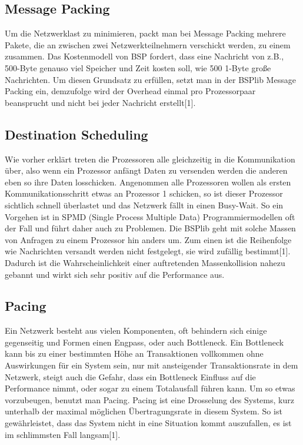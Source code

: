 \documentclass[a4paper,10pt]{scrartcl}
\begin{document}
\subsection{Message Packing}
Um die Netzwerklast zu minimieren, packt man bei Message Packing mehrere Pakete, die an zwischen zwei Netzwerkteilnehmern verschickt werden, zu einem zusammen. Das Kostenmodell von BSP fordert, dass eine Nachricht von z.B., 500-Byte genauso viel Speicher und Zeit kosten soll, wie 500 1-Byte große Nachrichten. Um diesen Grundsatz zu erfüllen, setzt man in der BSPlib Message Packing ein, demzufolge wird der Overhead einmal pro Prozessorpaar beansprucht und nicht bei jeder Nachricht erstellt[1].

\subsection{Destination Scheduling}
Wie vorher erklärt treten die Prozessoren alle gleichzeitig in die Kommunikation über, also wenn ein Prozessor anfängt Daten zu versenden werden die anderen eben so ihre Daten losschicken. Angenommen alle Prozessoren wollen als ersten Kommunikationsschritt etwas an Prozessor 1 schicken, so ist dieser Prozessor sichtlich schnell überlastet und das Netzwerk fällt in einen Busy-Wait. So ein Vorgehen ist in SPMD (Single Process Multiple Data) Programmiermodellen oft der Fall und führt daher auch zu Problemen. Die BSPlib geht mit solche Massen von Anfragen zu einem Prozessor hin anders um. Zum einen ist die Reihenfolge wie Nachrichten versandt werden nicht festgelegt, sie wird zufällig bestimmt[1]. Dadurch ist die Wahrscheinlichkeit einer auftretenden Massenkollision nahezu gebannt und wirkt sich sehr positiv auf die Performance aus.
\subsection{Pacing}
Ein Netzwerk besteht aus vielen Komponenten, oft behindern sich einige gegenseitig und Formen einen Engpass, oder auch Bottleneck. Ein Bottleneck kann bis zu einer bestimmten Höhe an Transaktionen vollkommen ohne Auswirkungen für ein System sein, nur mit ansteigender Transaktionsrate in dem Netzwerk, steigt auch die Gefahr, dass ein Bottleneck Einfluss auf die Performance nimmt, oder sogar zu einem Totalausfall führen kann. Um so etwas vorzubeugen, benutzt man Pacing. Pacing ist eine Drosselung des Systems, kurz unterhalb der maximal möglichen Übertragungsrate in diesem System. So ist gewährleistet, dass das System nicht in eine Situation kommt auszufallen, es ist im schlimmsten Fall langsam[1].
\newpage
\end{document}
